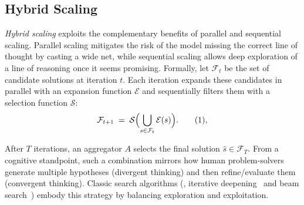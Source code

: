 \subsection{Hybrid Scaling}
\label{subsec:hybridsclaing}
\textit{Hybrid scaling} exploits the complementary benefits of parallel and sequential scaling. Parallel scaling mitigates the risk of the model missing the correct line of thought by casting a wide net, while sequential scaling allows deep exploration of a line of reasoning once it seems promising. 
Formally, let $\mathcal{F}_t$ be the set of candidate solutions at iteration $t$. 
Each iteration expands these candidates in parallel with an expansion function $\mathcal{E}$ and sequentially filters them with a selection function $\mathcal{S}$:
\begin{equation}
  \mathcal{F}_{t+1} \;=\;
  \mathcal{S}\Bigl(\bigcup_{s \in \mathcal{F}_t} \mathcal{E}(s)\Bigr).
  \tag{1},
\end{equation}

After $T$ iterations, an aggregator $A$ selects the final solution $\hat{s} \in \mathcal{F}_T$. 
From a cognitive standpoint, such a combination mirrors how human problem-solvers generate multiple hypotheses (divergent thinking) and then refine/evaluate them (convergent thinking).
Classic search algorithms (\eg, iterative deepening~\citep{chen2025iterativedeepeningsamplinglarge} and beam search~\citep{snell2024scaling}) embody this strategy by balancing exploration and exploitation.

